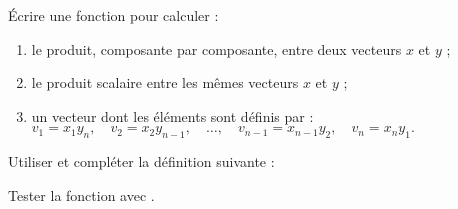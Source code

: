 Écrire une fonction pour calculer :
\begin{enumerate}[label=\alph*)]
  \item le produit, composante par composante, entre deux vecteurs $x$ et $y$ ;
  \item le produit scalaire entre les mêmes vecteurs $x$ et $y$ ;
  \item un vecteur dont les éléments sont définis par : \\
        $v_1 = x_{1} y_n, \quad
        v_2 = x_2 y_{n-1}, \quad
        \dots, \quad
        v_{n-1} = x_{n-1} y_2, \quad
        v_n = x_n y_1.$
\end{enumerate}


Utiliser et compléter la définition suivante :


Tester la fonction avec \MAT.

